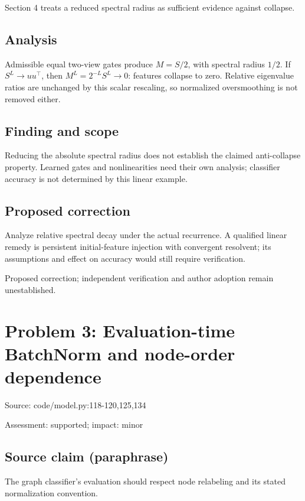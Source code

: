 \documentclass[11pt]{article}
\begin{document}
Section 4 treats a reduced spectral radius as sufficient evidence against collapse.

\subsection*{Analysis}

Admissible equal two-view gates produce \(M=S/2\), with spectral radius \(1/2\). If \(S^L\to uu^\top\), then \(M^L=2^{-L}S^L\to0\): features collapse to zero. Relative eigenvalue ratios are unchanged by this scalar rescaling, so normalized oversmoothing is not removed either.

\subsection*{Finding and scope}

Reducing the absolute spectral radius does not establish the claimed anti-collapse property. Learned gates and nonlinearities need their own analysis; classifier accuracy is not determined by this linear example.

\subsection*{Proposed correction}

Analyze relative spectral decay under the actual recurrence. A qualified linear remedy is persistent initial-feature injection with convergent resolvent; its assumptions and effect on accuracy would still require verification.

Proposed correction; independent verification and author adoption remain unestablished.

\section*{Problem 3: Evaluation-time BatchNorm and node-order dependence}

Source: code/model.py:118-120,125,134

Assessment: supported; impact: minor

\subsection*{Source claim (paraphrase)}

The graph classifier's evaluation should respect node relabeling and its stated normalization convention.
\end{document}
